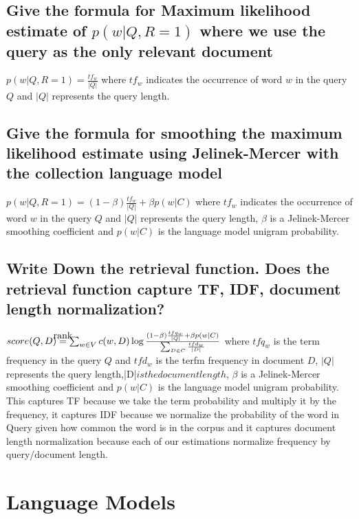 \documentclass[11pt]{article}
\newcommand\myeq{\stackrel{\mathclap{\normalfont\mbox{rank}}}{=}}
\begin{document}
\subsection{Give the formula for Maximum likelihood estimate of $p(w | Q, R= 1)$ where we use the query as the only relevant document}
$p(w | Q, R=1) = \frac{tf_w}{|Q|}$ where $tf_w$ indicates the occurrence of word $w$ in the query $Q$ and $|Q|$ represents the query length.
\subsection{Give the formula for smoothing the maximum likelihood estimate using Jelinek-Mercer with the collection language model}
$p(w | Q, R=1) = (1- \beta) \frac{tf_w}{|Q|}+ \beta p(w|C)$ where $tf_w$ indicates the occurrence of word $w$ in the query $Q$ and $|Q|$ represents the query length, $\beta$ is a Jelinek-Mercer smoothing coefficient and $p(w|C)$ is the language model unigram probability.
\subsection{Write Down the retrieval function. Does the retrieval function capture TF, IDF, document length normalization?}
$score(Q,D) \myeq  \sum_{w \in V} c(w,D) \log \frac{(1- \beta) \frac{tfq_w}{|Q|}+ \beta p(w|C)}{\sum_{D \in C} \frac{tfd_w}{|D|}} $ where $tfq_w$ is the term frequency in the query $Q$ and $tfd_w$ is the terfm frequency in document $D$, $|Q|$ represents the query length,|D|$ is the document length$, $\beta$ is a Jelinek-Mercer smoothing coefficient and $p(w|C)$ is the language model unigram probability. \\
This captures TF because we take the term probability and multiply it by the frequency, it captures IDF because we normalize the probability of the word in Query given how common the word is in the corpus and it captures document length normalization because each of our estimations normalize frequency by query/document length.
\section{Language Models}
\end{document}
